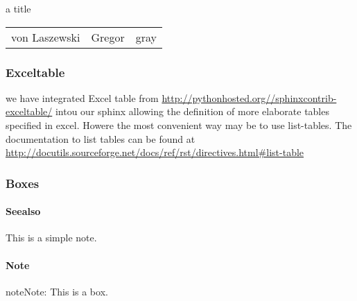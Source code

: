 \begin{threeparttable}
\capstart\caption{a title}\label{\detokenize{lesson/doc/rst:id1}}
\noindent\begin{tabulary}{\linewidth}{|L|L|L|}
\hline
{}\relax &\relax &\relax \\
\hline
von Laszewski
&
Gregor
&
gray
\\
\hline\end{tabulary}

\end{threeparttable}



\subsubsection{Exceltable}
\label{\detokenize{lesson/doc/rst:exceltable}}
we have integrated Excel table from
\url{http://pythonhosted.org//sphinxcontrib-exceltable/} intou our sphinx
allowing the definition of more elaborate tables specified in
excel. Howere the most convenient way may be to use list-tables. The
documentation to list tables can be found at
\url{http://docutils.sourceforge.net/docs/ref/rst/directives.html\#list-table}


\subsubsection{Boxes}
\label{\detokenize{lesson/doc/rst:boxes}}

\paragraph{Seealso}
\label{\detokenize{lesson/doc/rst:seealso}}
\begin{sphinxVerbatim}[commandchars=\\\{\}]
       
\end{sphinxVerbatim}




This is a simple  note.




\paragraph{Note}
\label{\detokenize{lesson/doc/rst:note}}
\begin{sphinxadmonition}{note}{Note:}
This is a  box.
\end{sphinxadmonition}

